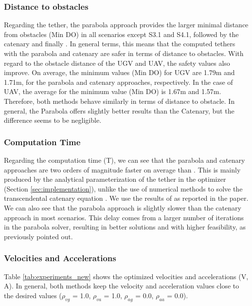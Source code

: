 \subsubsection{Distance to obstacles}
Regarding the tether, the parabola approach provides the larger minimal distance from obstacles (Min DO) in all scenarios except S3.1 and S4.1, followed by the catenary and finally \cite{smartinezr2023}. In general terms, this means that the computed tethers with the parabola and catenary are safer in terms of distance to obstacles. With regard to the obstacle distance of the UGV and UAV, the safety values also improve. On average, the minimum values (Min DO) for UGV are 1.79m and 1.71m, for the parabola and catenary approaches, respectively. In the case of UAV, the average for the minimum value (Min DO) is 1.67m and 1.57m. Therefore, both methods behave similarly in terms of distance to obstacle. In general, the Parabola offers slightly better results than the Catenary, but the difference seems to be negligible. 

\subsubsection{Computation Time}
Regarding the computation time (T), we can see that the parabola and catenary approaches are two orders of magnitude faster on average than \cite{smartinezr2023}. This is mainly produced by the analytical parameterization of the tether in the optimizer (Section \ref{sec:implementation}), unlike the use of numerical methods to solve the transcendental catenary equation \cite{BOOKOFCURVES}. We use the results of \cite{smartinezr2023} as reported in the paper. %
We can also see that the parabola approach is slightly slower than the catenary approach in most scenarios. This delay comes from a larger number of iterations in the parabola solver, resulting in better solutions and with higher feasibility, as previously pointed out. 

\subsubsection{Velocities and Accelerations}
Table \ref{tab:experiments_new} shows the optimized velocities and accelerations (V, A). In general, both methods keep the velocity and acceleration values close to the desired values ($\rho_{vg}$ = 1.0, $\rho_{va}$ = 1.0, $\rho_{ag}$ = 0.0, $\rho_{aa}$ = 0.0).


